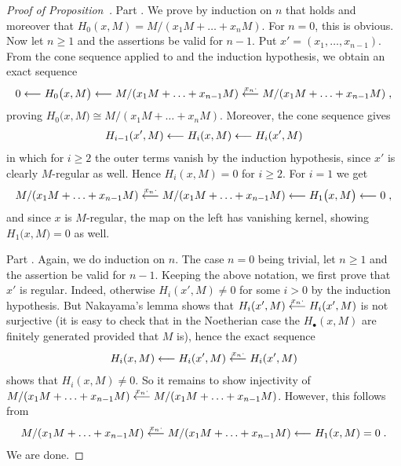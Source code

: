 \documentclass[a4paper,parskip=half,numbers=enddot, DIV=12]{scrreprt}
\begin{document}
\begin{proof}[Proof of Proposition~]
	Part . We prove by induction on $n$ that  holds and moreover that $H_0(x,M)=M/(x_1M+\ldots+x_nM)$. For $n=0$, this is obvious. Now let $n\geq 1$ and the assertions be valid for $n-1$. Put $x'=(x_1,\ldots,x_{n-1})$. From the cone sequence  applied to  and the induction hypothesis, we obtain an exact sequence
	\begin{align*}
		0\lmorphism H_0\big(x,M\big)\lmorphism M/(x_1M+\ldots+x_{n-1}M)\lmorphism[x_n\cdot]M/(x_1M+\ldots+x_{n-1}M)\;,
	\end{align*}
	proving $H_0\big(x,M\big)\cong M/(x_1M+\ldots+x_nM)$. Moreover, the cone sequence gives 
	\begin{align*}
		H_{i-1}(x',M)\lmorphism H_i(x,M)\lmorphism H_i(x',M)
	\end{align*}
	in which for $i\geq 2$ the outer terms vanish by the induction hypothesis, since $x'$ is clearly $M$-regular as well. Hence $H_i(x,M)=0$ for $i\geq 2$. For $i=1$ we get
	\begin{align*}
		M/(x_1M+\ldots+x_{n-1}M)\lmorphism[x_n\cdot]M/(x_1M+\ldots+x_{n-1}M)\lmorphism H_1\big(x,M\big)\lmorphism 0\;,
	\end{align*}
	and since $x$ is $M$-regular, the map on the left has vanishing kernel, showing $H_1\big(x,M\big)=0$ as well.
	
	Part . Again, we do induction on $n$. The case $n=0$ being trivial, let $n\geq 1$ and the assertion be valid for $n-1$. Keeping the above notation, we first prove that $x'$ is regular. Indeed, otherwise $H_i(x',M)\neq 0$ for some $i>0$ by the induction hypothesis. But Nakayama's lemma shows that $H_i(x',M)\lmorphism[x_n\cdot]H_i(x',M)$ is not surjective (it is easy to check that in the Noetherian case the $H_\bullet(x,M)$ are finitely generated provided that $M$ is), hence the exact sequence
	\begin{align*}
		H_i(x,M)\lmorphism H_i(x',M)\lmorphism[x_n\cdot]H_i(x',M)
	\end{align*}
	shows that $H_i(x,M)\neq 0$. So it remains to show injectivity of $M/(x_1M+\ldots+x_{n-1}M)\lmorphism[x_n\cdot]M/(x_1M+\ldots+x_{n-1}M)$. However, this follows from
	\begin{align*}
		M/(x_1M+\ldots+x_{n-1}M)\lmorphism[x_n\cdot]M/(x_1M+\ldots+x_{n-1}M)\lmorphism H_1(x,M)=0\;.
	\end{align*}
	We are done.
\end{proof}
\end{document}
